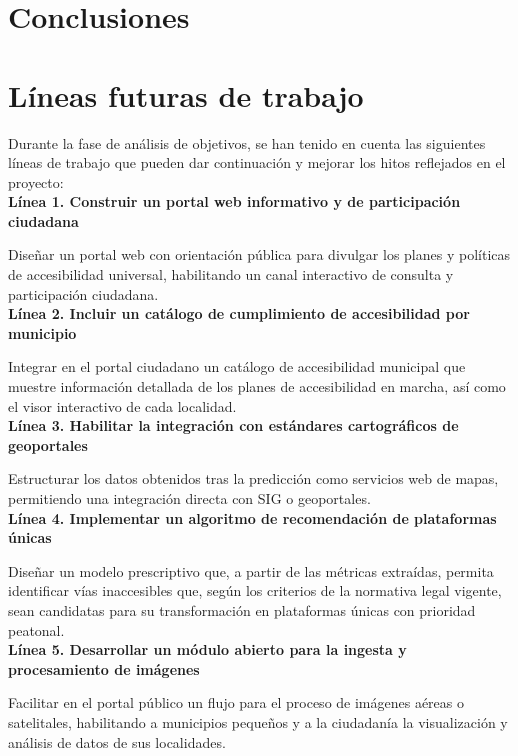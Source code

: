\section{Conclusiones}


\section{Líneas futuras de trabajo}
Durante la fase de análisis de objetivos, se han tenido en cuenta las siguientes líneas de trabajo que pueden dar continuación y mejorar los hitos reflejados en el proyecto:
\\

\textbf{Línea 1. Construir un portal web informativo y de participación ciudadana}

Diseñar un portal web con orientación pública para divulgar los planes y políticas de accesibilidad universal, habilitando un canal interactivo de consulta y participación ciudadana.
\\

\textbf{Línea 2. Incluir un catálogo de cumplimiento de accesibilidad por municipio}

Integrar en el portal ciudadano un catálogo de accesibilidad municipal que muestre información detallada de los planes de accesibilidad en marcha, así como el visor interactivo de cada localidad.
\\

\textbf{Línea 3. Habilitar la integración con estándares cartográficos de geoportales}

Estructurar los datos obtenidos tras la predicción como servicios web de mapas, permitiendo una integración directa con \gls{SIG} o geoportales.
\\

\textbf{Línea 4. Implementar un algoritmo de recomendación de plataformas únicas}

Diseñar un modelo prescriptivo que, a partir de las métricas extraídas, permita identificar vías inaccesibles que, según los criterios de la normativa legal vigente, sean candidatas para su transformación en plataformas únicas con prioridad peatonal.
\\

\textbf{Línea 5. Desarrollar un módulo abierto para la ingesta y procesamiento de imágenes}

Facilitar en el portal público un flujo para el proceso de imágenes aéreas o satelitales, habilitando a municipios pequeños y a la ciudadanía la visualización y análisis de datos de sus localidades.
\\

